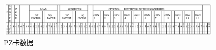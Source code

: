 
\begin{figure}[H]
\centering
\includegraphics[width=1.05\textwidth]{images/Paper_Fig_54.png}
\setcaptionwidth{\linewidth}
\caption{PZ卡数据}
\end{figure}

